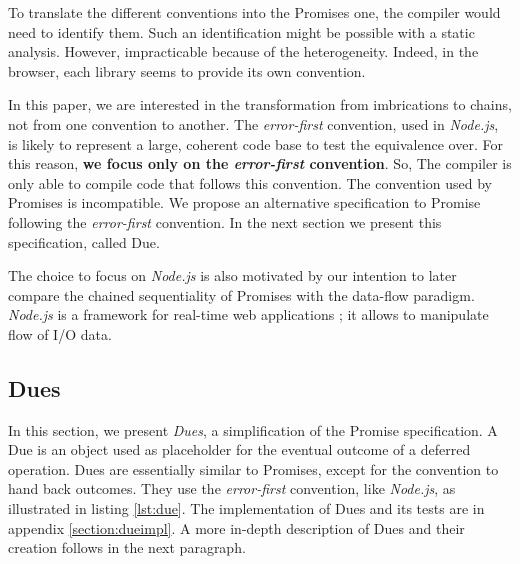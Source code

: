 To translate the different conventions into the Promises one, the compiler would need to identify them.
Such an identification might be possible with a static analysis. 
However, impracticable because of the heterogeneity.
Indeed, in the browser, each library seems to provide its own convention.

In this paper, we are interested in the transformation from imbrications to chains, not from one convention to another.
The \textit{error-first} convention, used in \textit{Node.js}, is likely to represent a large, coherent code base to test the equivalence over.
For this reason, \textbf{we focus only on the \textit{error-first} convention}.
So, The compiler is only able to compile code that follows this convention.
The convention used by Promises is incompatible.
We propose an alternative specification to Promise following the \textit{error-first} convention.
In the next section we present this specification, called Due.

The choice to focus on \textit{Node.js} is also motivated by our intention to later compare the chained sequentiality of Promises with the data-flow paradigm.
\textit{Node.js} is a framework for real-time web applications ; it allows to manipulate flow of I/O data.


\subsection{Dues} \label{section:definitions:due}

In this section, we present \textit{Dues}, a simplification of the Promise specification.
A Due is an object used as placeholder for the eventual outcome of a deferred operation.
Dues are essentially similar to Promises, except for the convention to hand back outcomes.
They use the \textit{error-first} convention, like \textit{Node.js}, as illustrated in listing \ref{lst:due}.
The implementation of Dues and its tests are in appendix \ref{section:dueimpl}.
A more in-depth description of Dues and their creation follows in the next paragraph.

